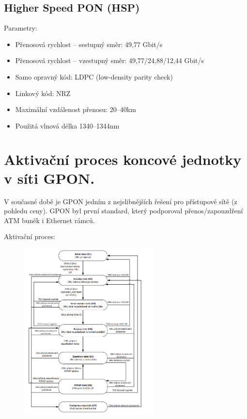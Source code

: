 \subsection{Higher Speed PON (HSP)}
Parametry:
\begin{itemize}
    \item Přenosová rychlost – sestupný směr: 49,77 Gbit/s
    \item Přenosová rychlost – vzestupný směr: 49,77/24,88/12,44 Gbit/s
    \item Samo opravný kód: LDPC (low-density parity check)
    \item Linkový kód: NRZ
    \item Maximální vzdálenost přenosu: 20–40km
    \item Použitá vlnová délka 1340–1344nm
\end{itemize}

\clearpage
\section{Aktivační proces koncové jednotky v síti GPON.}
V současné době je GPON jedním z nejslibnějších řešení pro přístupové sítě (z pohledu ceny). GPON byl první standard, který podporoval přenos/zapouzdření ATM buněk i Ethernet rámců. 

Aktivační proces:
\begin{figure} [h]
    \centering
    \includegraphics[width=0.63\textwidth]{snimky/proces.png}
    \label{fig:uml}
\end{figure}

